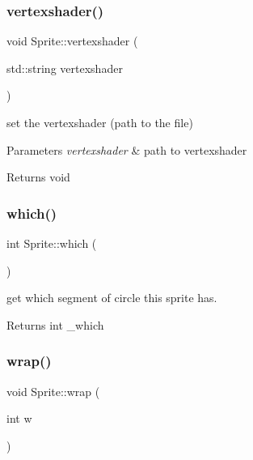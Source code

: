 \subsubsection{\texorpdfstring{vertexshader()}{vertexshader()}\hspace{0.1cm}{\footnotesize\ttfamily [2/2]}}
{\footnotesize\ttfamily void Sprite\+::vertexshader (\begin{DoxyParamCaption}\item[{std\+::string}]{vertexshader }\end{DoxyParamCaption})\hspace{0.3cm}{\ttfamily [inline]}}



set the vertexshader (path to the file) 


\begin{DoxyParams}{Parameters}
{\em vertexshader} & path to vertexshader \\
\hline
\end{DoxyParams}
\begin{DoxyReturn}{Returns}
void 
\end{DoxyReturn}
\mbox{\label{class_sprite_a0bfc3bb83da3bef06696cb55b5c47465}} 
\subsubsection{\texorpdfstring{which()}{which()}}
{\footnotesize\ttfamily int Sprite\+::which (\begin{DoxyParamCaption}{ }\end{DoxyParamCaption})\hspace{0.3cm}{\ttfamily [inline]}}



get which segment of circle this sprite has. 

\begin{DoxyReturn}{Returns}
int \+\_\+which 
\end{DoxyReturn}
\mbox{\label{class_sprite_a0e10957a274ba27a38601eac1fda210c}} 
\subsubsection{\texorpdfstring{wrap()}{wrap()}\hspace{0.1cm}{\footnotesize\ttfamily [1/2]}}
{\footnotesize\ttfamily void Sprite\+::wrap (\begin{DoxyParamCaption}\item[{int}]{w }\end{DoxyParamCaption})\hspace{0.3cm}{\ttfamily [inline]}}



